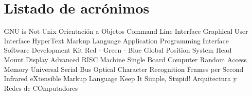 \chapter{Listado de acrónimos}

{\small
\begin{acronym}[XXXXXXXX]
       {\acs{GNU} is Not Unix}
        {Orientación a Objetos}
       {Command Line Interface}
       {Graphical User Interface}
      {HyperText Markup Language}
       {Application Programming Interface}
       {Software Development Kit}
       {Red - Green - Blue}
       {Global Position System}
       {Head Mount Display}
       {Advanced RISC Machine}
       {Single Board Computer}
       {Random Access Memory}
       {Universal Serial Bus}
       {Optical Character Recognition}
       {Frames per Second}
        {Infrared}
       {eXtensible Markup Language}
      {Keep It Simple, Stupid!}
      {Arquitectura y Redes de COmputadores}

\end{acronym}
}




